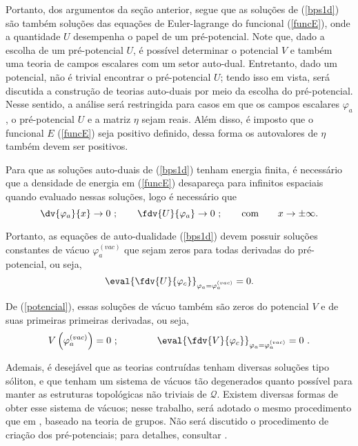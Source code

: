 Portanto, dos argumentos da seção anterior, segue que as soluções de (\ref{bps1d}) são também soluções das equações de Euler-lagrange do funcional (\ref{funcE}), onde a quantidade $U$ desempenha o papel de um pré-potencial. Note que, dado a escolha de um pré-potencial $U$, é possível determinar o potencial $V$ e também uma teoria de campos escalares com um setor auto-dual. Entretanto, dado um potencial, não é trivial encontrar o pré-potencial $U$; tendo isso em vista, será discutida a construção de teorias auto-duais por meio da escolha do pré-potencial. Nesse sentido, a análise será restringida para casos em que os campos escalares $\varphi_a$, o pré-potencial $U$ e a matriz $\eta$ sejam reais. Além disso, é imposto que o funcional $E$ (\ref{funcE}) seja positivo definido, dessa forma os autovalores de $\eta$ também devem ser positivos.

Para que as soluções auto-duais de (\ref{bps1d}) tenham energia finita, é necessário que a densidade de energia em (\ref{funcE}) desapareça para infinitos espaciais quando evaluado nessas soluções, logo é necessário que
\begin{equation}
    \dv{\varphi_a}{x} \rightarrow 0 \ ; \ \ \ \ \ \ \fdv{U}{\varphi_a} \rightarrow 0 \ ; \ \ \ \ \ \ \text{com} \ \ \ \ \ \ x \rightarrow \pm \infty.
    \label{phi_U_zero}
\end{equation}

Portanto, as equações de auto-dualidade (\ref{bps1d}) devem possuir soluções constantes de vácuo $\varphi_a^{(vac)}$ que sejam zeros para todas derivadas do pré-potencial, ou seja,
\begin{equation}
    \eval{\fdv{U}{\varphi_c}}_{\varphi_a = \varphi_a^{(vac)}} = 0.
    \label{dU_zero}
\end{equation}

De (\ref{potencial}), essas soluções de vácuo também são zeros do potencial $V$ e de suas primeiras primeiras derivadas, ou seja,
\begin{equation}
    V\left(\varphi_a^{(vac)}\right) = 0 \ ; \qquad \qquad \eval{\fdv{V}{\varphi_c}}_{\varphi_a = \varphi_a^{(vac)}} = 0 \ .
\end{equation}

Ademais, é desejável que as teorias contruídas tenham diversas soluções tipo sóliton, e que tenham um sistema de vácuos tão degenerados quanto possível para manter as estruturas topológicas não triviais de $\mathcal{Q}$. Existem diversas formas de obter esse sistema de vácuos; nesse trabalho, será adotado o mesmo procedimento que em \cite{laf(1+1)}, baseado na teoria de grupos. Não será discutido o procedimento de criação dos pré-potenciais; para detalhes, consultar \cite{laf(1+1)}.

